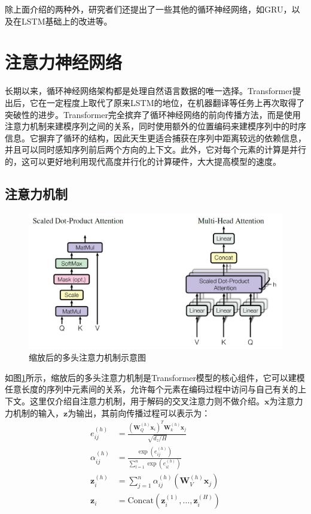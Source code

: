 除上面介绍的两种外，研究者们还提出了一些其他的循环神经网络，如GRU\cite{cho-etal-2014-properties}，以及在LSTM基础上的改进等。

\section{注意力神经网络}

长期以来，循环神经网络架构都是处理自然语言数据的唯一选择。Transformer\cite{attn17}提出后，它在一定程度上取代了原来LSTM的地位，在机器翻译等任务上再次取得了突破性的进步。Transformer完全摈弃了循环神经网络的前向传播方法，而是使用注意力机制来建模序列之间的关系，同时使用额外的位置编码来建模序列中的时序信息。它摒弃了循环的结构，因此天生更适合捕获在序列中距离较远的依赖信息，并且可以同时感知序列前后两个方向的上下文。此外，它对每个元素的计算是并行的，这可以更好地利用现代高度并行化的计算硬件，大大提高模型的速度。

\subsection{注意力机制}

\begin{figure}[]
    \centering
    \includegraphics[width=\linewidth]{figure/scaled_multiheaded_attn.png}
    \caption{缩放后的多头注意力机制示意图\cite{attn17}}
    \label{attn}
\end{figure}

如图\ref{attn}所示，缩放后的多头注意力机制是Transformer模型的核心组件，它可以建模任意长度的序列中元素间的关系，允许每个元素在编码过程中访问与自己有关的上下文。这里仅介绍自注意力机制，用于解码的交叉注意力则不做介绍。$\bm{x}$为注意力力机制的输入，$\bm{z}$为输出，其前向传播过程可以表示为：
\begin{align}
    e_{ij}^{\left(h\right)}&=\frac{\left(\bm{W}_Q^{\left(h\right)}\bm{x}_i\right)^T\bm{W}_k^{\left(h\right)}\bm{x}_j}{\sqrt{d_z/H}} \label{attn-forward:1}\\
    \alpha_{ij}^{\left(h\right)}&=\frac{\exp{\left(e_{ij}^{\left(h\right)}\right)}}{\sum_{l=1}^{n}\exp{\left(e_{il}^{\left(h\right)}\right)}} \label{attn-forward:2}\\
    \bm{z}_i^{\left(h\right)}&=\sum_{j=1}^{n}{\alpha_{ij}^{\left(h\right)}\left(\bm{W}_V^{\left(h\right)}\bm{x}_j\right)}\\
    \bm{z}_i&=\mathrm{Concat}\left(\bm{z}_i^{\left(1\right)},\ldots,\bm{z}_i^{\left(H\right)}\right)  \label{attn-forward:4}
\end{align}

